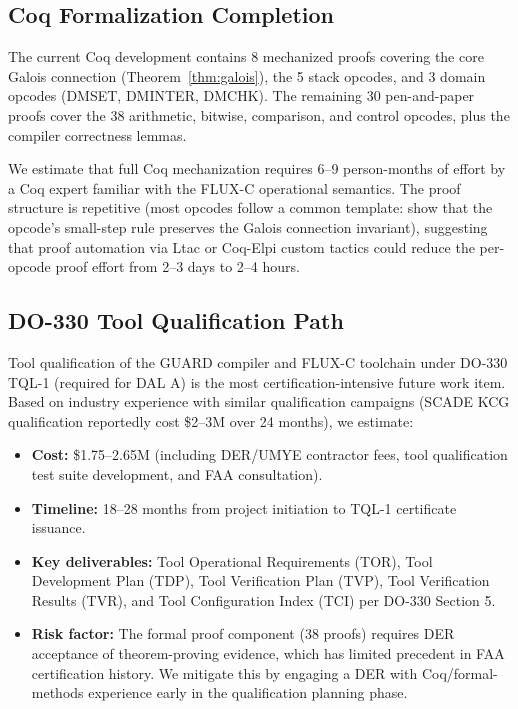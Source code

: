\documentclass[sigplan,review,anonymous]{acmart}
\begin{document}
{%
\subsection{Coq Formalization Completion}
\label{sec:future-coq}

The current Coq development contains 8 mechanized proofs covering the
core Galois connection (Theorem~\ref{thm:galois}), the 5 stack opcodes,
and 3 domain opcodes (DMSET, DMINTER, DMCHK). The remaining 30
pen-and-paper proofs cover the 38 arithmetic, bitwise, comparison, and
control opcodes, plus the compiler correctness lemmas.

We estimate that full Coq mechanization requires 6--9 person-months
of effort by a Coq expert familiar with the FLUX-C operational
semantics. The proof structure is repetitive (most opcodes follow a
common template: show that the opcode's small-step rule preserves the
Galois connection invariant), suggesting that proof automation via
Ltac or Coq-Elpi custom tactics could reduce the per-opcode proof
effort from 2--3 days to 2--4 hours.

\subsection{DO-330 Tool Qualification Path}
\label{sec:future-do330}

Tool qualification of the GUARD compiler and FLUX-C toolchain under
DO-330 TQL-1 (required for DAL A) is the most certification-intensive
future work item. Based on industry experience with similar qualification
campaigns (SCADE KCG qualification reportedly cost \$2--3M over 24 months),
we estimate:

\begin{itemize}
  \item \textbf{Cost:} \$1.75--2.65M (including DER/UMYE contractor fees,
        tool qualification test suite development, and FAA consultation).
  \item \textbf{Timeline:} 18--28 months from project initiation to TQL-1
        certificate issuance.
  \item \textbf{Key deliverables:} Tool Operational Requirements (TOR),
        Tool Development Plan (TDP), Tool Verification Plan (TVP),
        Tool Verification Results (TVR), and Tool Configuration Index (TCI)
        per DO-330 Section 5.
  \item \textbf{Risk factor:} The formal proof component (38 proofs)
        requires DER acceptance of theorem-proving evidence, which has
        limited precedent in FAA certification history. We mitigate this
        by engaging a DER with Coq/formal-methods experience early in
        the qualification planning phase.
\end{itemize}

}
\end{document}
